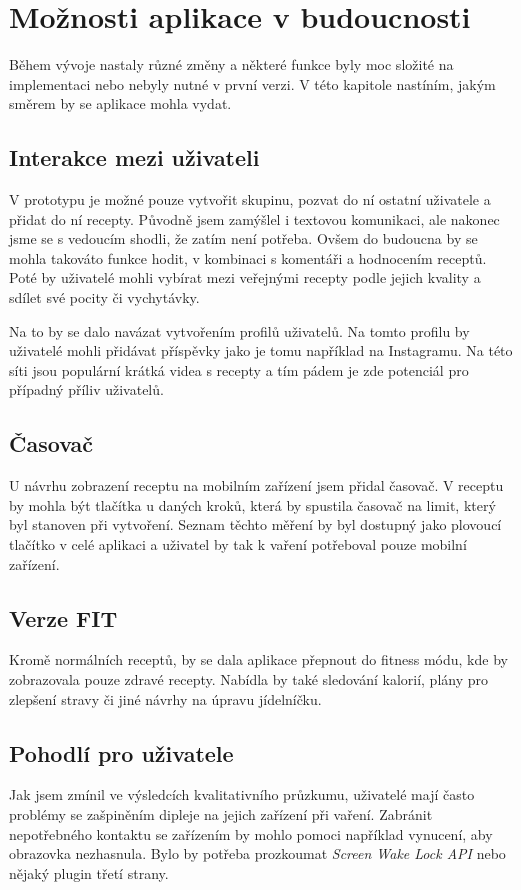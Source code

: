 
\chapter{Možnosti aplikace v budoucnosti}

Během vývoje nastaly různé změny a některé funkce byly moc složité na implementaci nebo nebyly nutné v první verzi.
V této kapitole nastíním, jakým směrem by se aplikace mohla vydat.

\section{Interakce mezi uživateli}
V prototypu je možné pouze vytvořit skupinu, pozvat do ní ostatní uživatele a přidat do ní recepty. Původně jsem zamýšlel
i textovou komunikaci, ale nakonec jsme se s vedoucím shodli, že zatím není potřeba. Ovšem do budoucna by se mohla takováto
funkce hodit, v kombinaci s komentáři a hodnocením receptů. Poté by uživatelé mohli vybírat mezi veřejnými recepty podle
jejich kvality a sdílet své pocity či vychytávky.

Na to by se dalo navázat vytvořením profilů uživatelů. Na tomto profilu by uživatelé mohli přidávat příspěvky jako je tomu
například na Instagramu. Na této síti jsou populární krátká videa s recepty a tím pádem je zde potenciál pro případný %
příliv uživatelů.

\section{Časovač}
U návrhu zobrazení receptu na mobilním zařízení jsem přidal časovač. V receptu by mohla být tlačítka u daných kroků, která
by spustila časovač na limit, který byl stanoven při vytvoření. Seznam těchto měření by byl dostupný jako plovoucí tlačítko
v celé aplikaci a uživatel by tak k vaření potřeboval pouze mobilní zařízení.

\section{Verze FIT}
Kromě normálních receptů, by se dala aplikace přepnout do fitness módu, kde by zobrazovala pouze zdravé recepty. Nabídla by
také sledování kalorií, plány pro zlepšení stravy či jiné návrhy na úpravu jídelníčku.

\section{Pohodlí pro uživatele}
Jak jsem zmínil ve výsledcích kvalitativního průzkumu, uživatelé mají často problémy se zašpiněním dipleje na jejich zařízení při vaření.
Zabránit nepotřebného kontaktu se zařízením by mohlo pomoci například vynucení, aby obrazovka nezhasnula. Bylo by potřeba prozkoumat
\emph{Screen Wake Lock API} nebo nějaký plugin třetí strany. %

